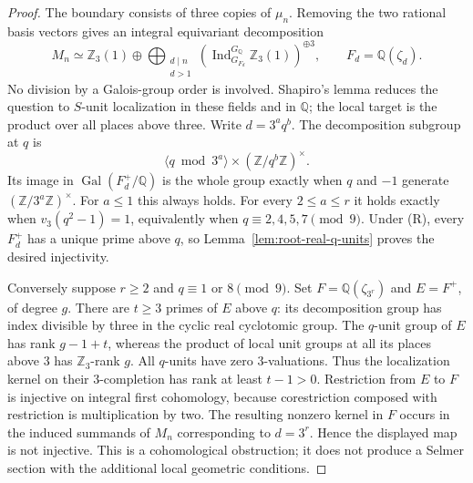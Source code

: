 \begin{proof}
The boundary consists of three copies of $\mu_n$. Removing the two
rational basis vectors gives an integral equivariant decomposition
\[
 M_n\simeq\mathbb Z_3(1)\oplus
 \bigoplus_{\substack{d\mid n\\d>1}}
 \left(\operatorname{Ind}_{G_{F_d}}^{G_{\mathbb Q}}
       \mathbb Z_3(1)\right)^{\oplus3},
 \qquad F_d=\mathbb Q(\zeta_d).
\]
No division by a Galois-group order is involved. Shapiro's lemma reduces
the question to $S$-unit localization in these fields and in $\mathbb Q$;
the local target is the product over all places above three.
Write $d=3^a q^b$.  The decomposition subgroup at $q$ is
\[
 \langle q\bmod3^a\rangle\times(\mathbb Z/q^b\mathbb Z)^\times.
\]
Its image in $\operatorname{Gal}(F_d^+/\mathbb Q)$ is the whole group
exactly when $q$ and $-1$ generate $(\mathbb Z/3^a\mathbb Z)^\times$.
For $a\le1$ this always holds.  For every $2\le a\le r$ it holds
exactly when $v_3(q^2-1)=1$, equivalently when $q\equiv2,4,5,7\pmod9$.
Under (R), every $F_d^+$ has a unique prime above $q$, so
Lemma~\ref{lem:root-real-q-units} proves the desired injectivity.

Conversely suppose $r\ge2$ and $q\equiv1$ or $8\pmod9$.
Set $F=\mathbb Q(\zeta_{3^r})$ and $E=F^+$, of degree $g$.
There are $t\ge3$ primes of $E$ above $q$: its decomposition group
has index divisible by three in the cyclic real cyclotomic group.
The $q$-unit group of $E$ has rank $g-1+t$, whereas the product of
local unit groups at all its places above $3$ has $\mathbb Z_3$-rank $g$.
All $q$-units have zero $3$-valuations.  Thus the localization kernel
on their $3$-completion has rank at least $t-1>0$.
Restriction from $E$ to $F$ is injective on integral first cohomology,
because corestriction composed with restriction is multiplication by two.
The resulting nonzero kernel in $F$ occurs in the induced summands of
$M_n$ corresponding to $d=3^r$.  Hence the displayed map is not
injective.  This is a cohomological obstruction; it does not produce
a Selmer section with the additional local geometric conditions.
\end{proof}

